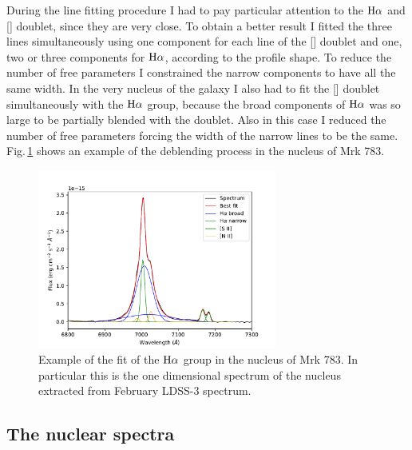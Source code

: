 \documentclass[../thesis.tex]{subfiles}
\begin{document}
During the line fitting procedure I had to pay particular attention to the $\rm H\alpha$ and [] doublet, since they are very close.
To obtain a better result I fitted the three lines simultaneously using one component for each line of the [] doublet and one, two or three components for $\rm H\alpha$, according to the profile shape.
To reduce the number of free parameters I constrained the narrow components to have all the same width.
In the very nucleus of the galaxy I also had to fit the [] doublet  simultaneously with the $\rm H\alpha$ group, because the broad components of $\rm H\alpha$ was so large to be partially blended with the doublet.
Also in this case I reduced the number of free parameters forcing the width of the narrow lines to be the same.
Fig.\,\ref{fig:pap3_deblending} shows an example of the deblending process in the nucleus of Mrk 783.

\begin{figure}
\centering
\includegraphics[width=0.7\textwidth]{images/paper3/deblending.pdf} 
\caption[]{Example of the fit of the $\rm H\alpha$ group in the nucleus of Mrk 783. In particular this is the one dimensional spectrum of the nucleus extracted from February LDSS-3 spectrum.} 
\label{fig:pap3_deblending}
\end{figure} 


\subsection{The nuclear spectra}
\end{document}
